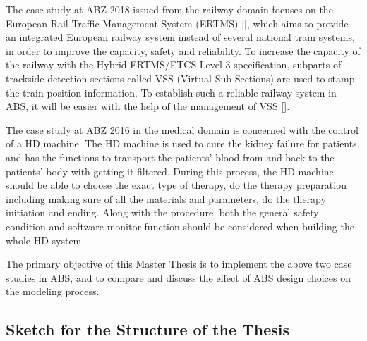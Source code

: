 \documentclass[article,dr=phil,type=drfinal,colorback,accentcolor=tud9c]{tudthesis}
\begin{document}
  The case study at ABZ 2018 issued from the railway domain focuses on the European Rail Traffic Management System (ERTMS) [], which aims to provide an integrated European railway system instead of several national train systems, in order to improve the capacity, safety and reliability. To increase the capacity of the railway with the Hybrid ERTMS/ETCS Level 3 specification, subparts of trackside detection sections called VSS (Virtual Sub-Sections) are used to stamp the train position information. To establish such a reliable railway system in ABS, it will be easier with the help of the management of VSS [].
  
  The case study at ABZ 2016 in the medical domain is concerned with the control of a HD machine. The HD machine is used to cure the kidney failure for patients, and has the functions to transport the patients' blood from and back to the patients' body with getting it filtered. During this process, the HD machine should be able to choose the exact type of therapy, do the therapy preparation including making sure of all the materials and parameters, do the therapy initiation and ending. Along with the procedure, both the general safety condition and software monitor function should be considered when building the whole HD system. 
  
  The primary objective of this Master Thesis is to implement the above two case studies in ABS, and to compare and discuss the effect of ABS design choices on the modeling process.
  
  \subsection{Sketch for the Structure of the Thesis}
\end{document}
